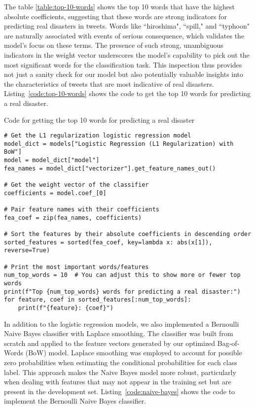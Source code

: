 \documentclass{article}
\begin{document}
The table \ref{table:top-10-words} shows the top 10 words that have the highest absolute coefficients, suggesting that these words are strong indicators for predicting real disasters in tweets. Words like “hiroshima", “spill," and “typhoon" are naturally associated with events of serious consequence, which validates the model's focus on these terms. The presence of such strong, unambiguous indicators in the weight vector underscores the model's capability to pick out the most significant words for the classification task. This inspection thus provides not just a sanity check for our model but also potentially valuable insights into the characteristics of tweets that are most indicative of real disasters. Listing~\ref{code:top-10-words} shows the code to get the top 10 words for predicting a real disaster.

\begin{listing}[H]
\caption{Code for getting the top 10 words for predicting a real disaster}
\label{code:top-10-words}
\begin{verbatim}
# Get the L1 regularization logistic regression model
model_dict = models["Logistic Regression (L1 Regularization) with BoW"]
model = model_dict["model"]
fea_names = model_dict["vectorizer"].get_feature_names_out()

# Get the weight vector of the classifier
coefficients = model.coef_[0]

# Pair feature names with their coefficients
fea_coef = zip(fea_names, coefficients)

# Sort the features by their absolute coefficients in descending order
sorted_features = sorted(fea_coef, key=lambda x: abs(x[1]), reverse=True)

# Print the most important words/features
num_top_words = 10  # You can adjust this to show more or fewer top words
print(f"Top {num_top_words} words for predicting a real disaster:")
for feature, coef in sorted_features[:num_top_words]:
    print(f"{feature}: {coef}")
\end{verbatim}
\end{listing}

In addition to the logistic regression models, we also implemented a Bernoulli Naive Bayes classifier with Laplace smoothing. The classifier was built from scratch and applied to the feature vectors generated by our optimized Bag-of-Words (BoW) model. Laplace smoothing was employed to account for possible zero probabilities when estimating the conditional probabilities for each class label. This approach makes the Naive Bayes model more robust, particularly when dealing with features that may not appear in the training set but are present in the development set. Listing~\ref{code:naive-bayes} shows the code to implement the Bernoulli Naive Bayes classifier.
\end{document}
